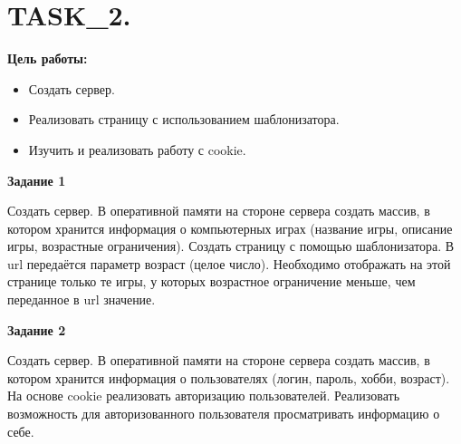 \chapter{TASK\_2.}

\textbf{Цель работы:}

\begin{itemize} 
	\item Создать сервер.
	\item Реализовать страницу с использованием шаблонизатора.
	\item Изучить и реализовать работу с cookie.
\end{itemize}

\textbf{Задание 1}

Создать сервер. В оперативной памяти на стороне сервера создать массив, в котором хранится информация о компьютерных играх (название игры, описание игры, возрастные ограничения). Создать страницу с помощью шаблонизатора. В url передаётся параметр возраст (целое число). Необходимо отображать на этой странице только те игры, у которых возрастное ограничение меньше, чем переданное в url значение.

\textbf{Задание 2}

Создать сервер. В оперативной памяти на стороне сервера создать массив, в котором хранится информация о пользователях (логин, пароль, хобби, возраст). На основе cookie реализовать авторизацию пользователей. Реализовать возможность для авторизованного пользователя просматривать информацию о себе.

